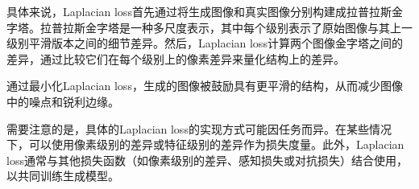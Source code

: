 \documentclass[letterpaper,12pt]{article}
\begin{document}
	具体来说，Laplacian loss首先通过将生成图像和真实图像分别构建成拉普拉斯金字塔。拉普拉斯金字塔是一种多尺度表示，其中每个级别表示了原始图像与其上一级别平滑版本之间的细节差异。然后，Laplacian loss计算两个图像金字塔之间的差异，通过比较它们在每个级别上的像素差异来量化结构上的差异。
	
	通过最小化Laplacian loss，生成的图像被鼓励具有更平滑的结构，从而减少图像中的噪点和锐利边缘。
	
	需要注意的是，具体的Laplacian loss的实现方式可能因任务而异。在某些情况下，可以使用像素级别的差异或特征级别的差异作为损失度量。此外，Laplacian loss通常与其他损失函数（如像素级别的差异、感知损失或对抗损失）结合使用，以共同训练生成模型。
	
%	
%
%	
%	
%				
%				
%				
%				
%				
%				
\end{document}
